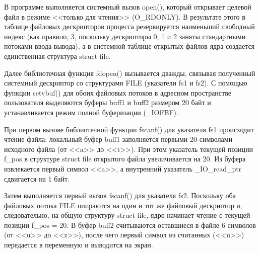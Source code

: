 


В программе выполняется системный вызов open(), который открывает целевой 
файл в режиме <<только для чтения>> (O\_RDONLY). В результате этого в таблице 
файловых дескрипторов процесса резервируется наименьший свободный индекс 
(как правило, 3, поскольку дескрипторы 0, 1 и 2 заняты стандартными потоками 
ввода-вывода), а в системной таблице открытых файлов ядра создается 
единственная структура struct file.

Далее библиотечная функция fdopen() вызывается дважды, связывая полученный 
системный дескриптор со структурами FILE (указатели fs1 и fs2). С помощью 
функции setvbuf() для обоих файловых потоков в адресном пространстве 
пользователя выделяются буферы buff1 и buff2 размером 20 байт и устанавливается 
режим полной буферизации (\_IOFBF).

При первом вызове библиотечной функции fscanf() для указателя fs1 происходит 
чтение файла: локальный буфер buff1 заполняется первыми 20 
символами исходного файла (от <<a>> до <<t>>). При этом указатель текущей 
позиции f\_pos в структуре struct file открытого файла увеличивается на 20. Из 
буфера извлекается первый символ <<a>>, а внутренний указатель \_IO\_read\_ptr 
сдвигается на 1 байт.

Затем выполняется первый вызов fscanf() для указателя fs2. Поскольку оба 
файловых потока FILE опираются на один и тот же файловый дескриптор и, 
следовательно, на общую структуру struct file, ядро начинает чтение с 
текущей позиции f\_pos = 20. В буфер buff2 считываются оставшиеся в файле 
6 символов (от <<u>> до <<z>>), после чего первый символ из считанных (<<u>>) 
передается в переменную и выводится на экран.

